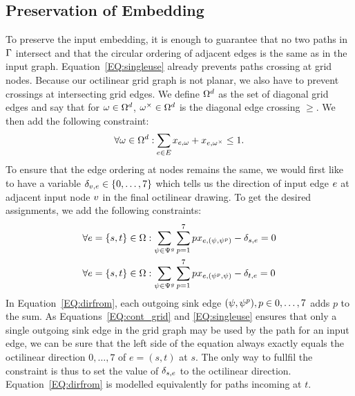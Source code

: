 \documentclass[sigconf]{acmart}
\begin{document}
\subsection{Preservation of Embedding}

To preserve the input embedding, it is enough to guarantee that no two paths in $\Gamma$ intersect and that the circular ordering of adjacent edges is the same as in the input graph.
Equation~\ref{EQ:singleuse} already prevents paths crossing at grid nodes.
Because our octilinear grid graph is not planar, we also have to prevent crossings at intersecting grid edges.
We define $\Omega^d$ as the set of diagonal grid edges and say that for $\omega \in \Omega^d$, $\omega^{\times} \in \Omega^d$ is the diagonal edge crossing $\ge$. 
We then add the following constraint:
%
\begin{equation}
  \forall \ge \in \gE^d: \Psum{\ie \in \iE} \geused{\ie}{\ge} + \geused{\ie}{\ge^{\times}} \leq 1. \label{EQ:crossing}
\end{equation}
%
To ensure that the edge ordering at nodes remains the same, we would first like to have a variable $\delta_{v,e} \in \{0, \dots, 7\}$ which tells us the direction of input edge $e$ at adjacent input node $v$ in the final octilinear drawing.
To get the desired assignments, we add the following constraints:
%
\begin{align}
  \forall e = \{s, t\} \in \Omega&: \sum_{\psi \in \Psi^g} \sum_{p = 1}^7 p x_{e,(\psi,  \psi^p)} - \delta_{s,e} = 0\label{EQ:dirfrom} \\
  \forall e = \{s, t\} \in \Omega&: \sum_{\psi \in \Psi^g} \sum_{p = 1}^7 p x_{e,(\psi^p, \psi)} - \delta_{t,e} = 0\label{EQ:dirto}
\end{align}
%
In Equation~\ref{EQ:dirfrom}, each outgoing sink edge $(\psi,  \psi^{p}), p \in {0, \dots, 7}$ adds $p$ to the sum.
As Equations~\ref{EQ:cont_grid} and \ref{EQ:singleuse} ensures that only a single outgoing sink edge in the grid graph may be used by the path for an input edge, we can be sure that the left side of the equation always exactly equals the octilinear direction $0, \dots, 7$ of $e = (s, t)$ at $s$.
The only way to fullfil the constraint is thus to set the value of $\delta_{s,e}$ to the octilinear direction.
Equation~\ref{EQ:dirfrom} is modelled equivalently for paths incoming at $t$.
\end{document}
